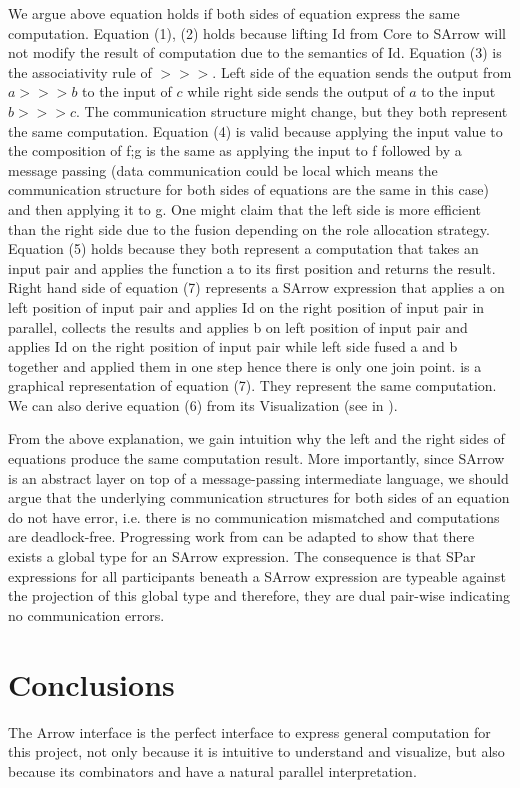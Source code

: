 We argue above equation holds if both sides of equation express the same computation. Equation (1), (2) holds because lifting Id from Core to SArrow will not modify the result of computation due to the semantics of Id. Equation (3) is the associativity rule of $>>>$. Left side of the equation sends the output from $a >>> b$ to the input of $c$ while right side sends the output of $a$ to the input $b >>> c$. The communication structure might change, but they both represent the same computation. Equation (4) is valid because applying the input value to the composition of f;g is the same as applying the input to f followed by a message passing (data communication could be local which means the communication structure for both sides of equations are the same in this case) and then applying it to g. One might claim that the left side is more efficient than the right side due to the fusion depending on the role allocation strategy. Equation (5) holds because they both represent a computation that takes an input pair and applies the function a to its first position and returns the result. Right hand side of equation (7) represents a SArrow expression that applies a on left position of input pair and applies Id on the right position of input pair in parallel, collects the results and applies b on left position of input pair and applies Id on the right position of input pair while left side fused a and b together and applied them in one step hence there is only one join point.  is a graphical representation of equation (7). They represent the same computation. We can also derive equation (6) from its Visualization (see in ).

From the above explanation, we gain intuition why the left and the right sides of equations produce the same computation result. More importantly, since SArrow is an abstract layer on top of a message-passing intermediate language, we should argue that the underlying communication structures for both sides of an equation do not have error, i.e. there is no communication mismatched and computations are deadlock-free. Progressing work from \cite{castroAlgebraicMultipartyProtocol} can be adapted to show that there exists a global type for an SArrow expression. The consequence is that SPar expressions for all participants beneath a SArrow expression are typeable against the projection of this global type and therefore, they are dual pair-wise indicating no communication errors.

\section{Conclusions}
The Arrow interface is the perfect interface to express general computation for this pro\-ject, not only because it is intuitive to understand and visualize, but also because its combinators \hask{***} and \hask{&&&} have a natural parallel interpretation. 

